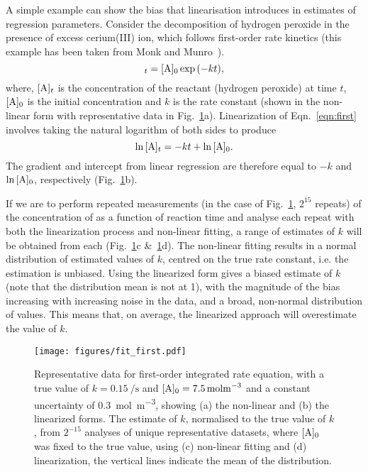 \documentclass[reprint,superscriptaddress,nobibnotes,amsmath,amssymb]{revtex4-2}
\begin{document}
A simple example can show the bias that linearisation introduces in estimates of regression parameters. 
Consider the decomposition of hydrogen peroxide  in the presence of excess cerium(III) ion, which follows first-order rate kinetics (this example has been taken from Monk and Munro~\cite{monk_math_2010}).
%
\begin{equation}
    [\ce{A}]_t = [\ce{A}]_0\exp{(-kt)},
    \label{eqn:first}
\end{equation}
%
where, $[\ce{A}]_t$ is the concentration of the reactant  (hydrogen peroxide) at time $t$, $[\ce{A}]_0$ is the initial concentration and $k$ is the rate constant (shown in the non-linear form with representative data in Fig.~\ref{fig:fit_first}a).
Linearization of Eqn.~\ref{eqn:first} involves taking the natural logarithm of both sides to produce
%
\begin{equation}
    \ln{[\ce{A}]_t} = -kt + \ln{[\ce{A}]_0}.
\end{equation}
%
The gradient and intercept from linear regression are therefore equal to $-k$ and $\ln{[\ce{A}]_0}$, respectively (Fig.~\ref{fig:fit_first}b).

If we are to perform repeated measurements (in the case of Fig.~\ref{fig:fit_first}, $2^{15}$ repeats) of the concentration of  as a function of reaction time and analyse each repeat with both the linearization process and non-linear fitting, a range of estimates of $k$ will be obtained from each (Fig.~\ref{fig:fit_first}c \&~\ref{fig:fit_first}d).
The non-linear fitting results in a normal distribution of estimated values of $k$, centred on the true rate constant, i.e. the estimation is unbiased. 
Using the linearized form gives a biased estimate of $k$ (note that the distribution mean is not at \num{1}), with the magnitude of the bias increasing with increasing noise in the data, and a broad, non-normal distribution of values. 
This means that, on average, the linearized approach will overestimate the value of $k$. 
%
\begin{figure}
  \texttt{[image: figures/fit\_first.pdf]}
  \caption{
    Representative data for first-order integrated rate equation, with a true value of $k=\SI{0.15}{\per\second}$ and $[\ce{A}]_0=\SI{7.5}{\mol\m^{-3}}$ and a constant uncertainty of \SI{0.3}{\mol\m^{-3}}, showing (a) the non-linear and (b) the linearized forms. 
    The estimate of $k$, normalised to the true value of $k$, from $2^{-15}$ analyses of unique representative datasets, where $[\ce{A}]_0$ was fixed to the true value, using (c) non-linear fitting and (d) linearization, the vertical lines indicate the mean of the distribution. 
    }
  \label{fig:fit_first}
\end{figure}
%
\end{document}
